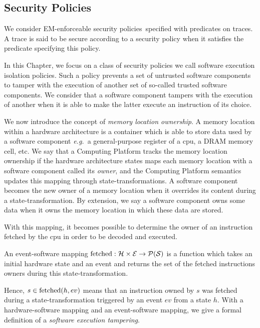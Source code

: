 \subsection{Security Policies}

We consider EM-enforceable security
policies\,\cite{schneider2000enforceable,schneider2} specified with predicates
on traces.
%
A trace is said to be secure according to a security policy when it satisfies the
predicate specifying this policy.

In this Chapter, we focus on a class of security policies we call software
execution isolation policies.
%
Such a policy prevents a set of untrusted software components to tamper with the
execution of another set of so-called trusted software components.
%
We consider that a software component tampers with the execution of another when
it is able to make the latter execute an instruction of its choice.

We now introduce the concept of \textit{memory location ownership}.
%
A memory location within a hardware architecture is a container which is able to
store data used by a software component \emph{e.g.}~a general-purpose register
of a \ac{cpu}, a DRAM memory cell, etc.
%
We say that a Computing Platform tracks the memory location ownership if the
hardware architecture states maps each memory location with a software component
called its \emph{owner}, and the Computing Platform semantics updates this
mapping through state-transformations.
%
A software component becomes the new owner of a memory location when it
overrides its content during a state-transformation.
%
By extension, we say a software component owns some data when it owns the memory
location in which these data are stored.

With this mapping, it becomes possible to determine the owner of an instruction
fetched by the \ac{cpu} in order to be decoded and executed.

\begin{definition}
  \label{def:evsoft}
  An event-software mapping
  $\mathrm{fet\-ched}: \mathcal{H} \times \mathcal{E} \rightarrow \mathcal{P}(\mathcal{S})$ is
  a function which takes an initial hardware state and an event and returns the
  set of the fetched instructions owners during this state-transformation.
\end{definition}

Hence, $s \in \mathrm{fetched}(h, ev)$ means that an instruction owned by $s$ was
fetched during a state-transformation triggered by an event $ev$ from a state
$h$.
%
With a hardware-software mapping and an event-software mapping, we give a formal
definition of a \textit{software execution tampering}.

